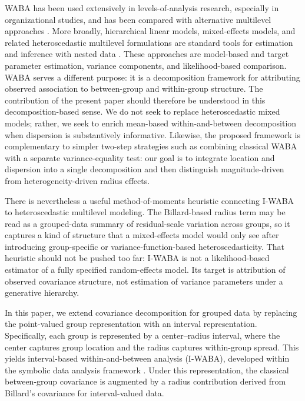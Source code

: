 \documentclass[preprint, times, 12pt, authoryear]{elsarticle}
\begin{document}
WABA has been used extensively in levels-of-analysis research, especially in organizational studies, and has been compared with alternative multilevel approaches \citep{yammarino1992application,dansereau1995individualized,yammarino1998multivariate,bliese2002benchmarking}. More broadly, hierarchical linear models, mixed-effects models, and related heteroscedastic multilevel formulations are standard tools for estimation and inference with nested data \citep{mcneish2019fixed,bliese2000within,castro2002data,garson2013fundamentals}. These approaches are model-based and target parameter estimation, variance components, and likelihood-based comparison. WABA serves a different purpose: it is a decomposition framework for attributing observed association to between-group and within-group structure. The contribution of the present paper should therefore be understood in this decomposition-based sense. We do not seek to replace heteroscedastic mixed models; rather, we seek to enrich mean-based within-and-between decomposition when dispersion is substantively informative. Likewise, the proposed framework is complementary to simpler two-step strategies such as combining classical WABA with a separate variance-equality test: our goal is to integrate location and dispersion into a single decomposition and then distinguish magnitude-driven from heterogeneity-driven radius effects.

There is nevertheless a useful method-of-moments heuristic connecting I-WABA to heteroscedastic multilevel modeling. The Billard-based radius term may be read as a grouped-data summary of residual-scale variation across groups, so it captures a kind of structure that a mixed-effects model would only see after introducing group-specific or variance-function-based heteroscedasticity. That heuristic should not be pushed too far: I-WABA is not a likelihood-based estimator of a fully specified random-effects model. Its target is attribution of observed covariance structure, not estimation of variance parameters under a generative hierarchy.

In this paper, we extend covariance decomposition for grouped data by replacing the point-valued group representation with an interval representation. Specifically, each group is represented by a center--radius interval, where the center captures group location and the radius captures within-group spread. This yields interval-based within-and-between analysis (I-WABA), developed within the symbolic data analysis framework \citep{billard2003statistics,billard2012symbolic}. Under this representation, the classical between-group covariance is augmented by a radius contribution derived from Billard's covariance for interval-valued data.
\end{document}
